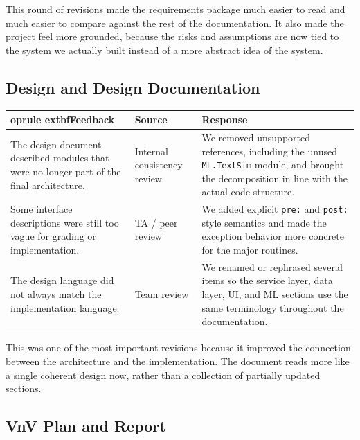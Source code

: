 \documentclass{article}
\begin{document}
This round of revisions made the requirements package much easier to read and
much easier to compare against the rest of the documentation. It also made the
project feel more grounded, because the risks and assumptions are now tied to
the system we actually built instead of a more abstract idea of the system.

\subsection{Design and Design Documentation}

\begin{tabularx}{\textwidth}{p{3.4cm} p{3.0cm} X}
	oprule
	extbf{Feedback} & \textbf{Source} & \textbf{Response} \\
\midrule
The design document described modules that were no longer part of the final architecture. & Internal consistency review & We removed unsupported references, including the unused \texttt{ML.TextSim} module, and brought the decomposition in line with the actual code structure. \\
\addlinespace
Some interface descriptions were still too vague for grading or implementation. & TA / peer review & We added explicit \texttt{pre:} and \texttt{post:} style semantics and made the exception behavior more concrete for the major routines. \\
\addlinespace
The design language did not always match the implementation language. & Team review & We renamed or rephrased several items so the service layer, data layer, UI, and ML sections use the same terminology throughout the documentation. \\
\bottomrule
\end{tabularx}

This was one of the most important revisions because it improved the connection
between the architecture and the implementation. The document reads more like a
single coherent design now, rather than a collection of partially updated
sections.

\subsection{VnV Plan and Report}
\end{document}
